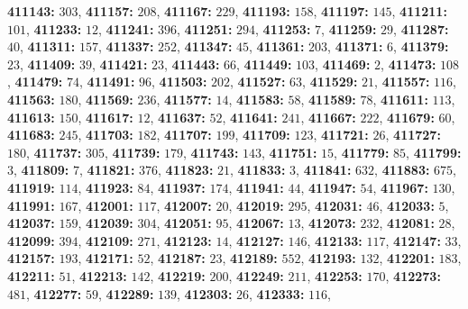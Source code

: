 \textsf{\bfseries 411143:} $303$, \textsf{\bfseries 411157:} $208$, \textsf{\bfseries 411167:} $229$, \textsf{\bfseries 411193:} $158$, \textsf{\bfseries 411197:} $145$, \textsf{\bfseries 411211:} $101$, \textsf{\bfseries 411233:} $12$, \textsf{\bfseries 411241:} $396$, \textsf{\bfseries 411251:} $294$, \textsf{\bfseries 411253:} $7$, \textsf{\bfseries 411259:} $29$, \textsf{\bfseries 411287:} $40$, \textsf{\bfseries 411311:} $157$, \textsf{\bfseries 411337:} $252$, \textsf{\bfseries 411347:} $45$, \textsf{\bfseries 411361:} $203$, \textsf{\bfseries 411371:} $6$, \textsf{\bfseries 411379:} $23$, \textsf{\bfseries 411409:} $39$, \textsf{\bfseries 411421:} $23$, \textsf{\bfseries 411443:} $66$, \textsf{\bfseries 411449:} $103$, \textsf{\bfseries 411469:} $2$, \textsf{\bfseries 411473:} $108$, \textsf{\bfseries 411479:} $74$, \textsf{\bfseries 411491:} $96$, \textsf{\bfseries 411503:} $202$, \textsf{\bfseries 411527:} $63$, \textsf{\bfseries 411529:} $21$, \textsf{\bfseries 411557:} $116$, \textsf{\bfseries 411563:} $180$, \textsf{\bfseries 411569:} $236$, \textsf{\bfseries 411577:} $14$, \textsf{\bfseries 411583:} $58$, \textsf{\bfseries 411589:} $78$, \textsf{\bfseries 411611:} $113$, \textsf{\bfseries 411613:} $150$, \textsf{\bfseries 411617:} $12$, \textsf{\bfseries 411637:} $52$, \textsf{\bfseries 411641:} $241$, \textsf{\bfseries 411667:} $222$, \textsf{\bfseries 411679:} $60$, \textsf{\bfseries 411683:} $245$, \textsf{\bfseries 411703:} $182$, \textsf{\bfseries 411707:} $199$, \textsf{\bfseries 411709:} $123$, \textsf{\bfseries 411721:} $26$, \textsf{\bfseries 411727:} $180$, \textsf{\bfseries 411737:} $305$, \textsf{\bfseries 411739:} $179$, \textsf{\bfseries 411743:} $143$, \textsf{\bfseries 411751:} $15$, \textsf{\bfseries 411779:} $85$, \textsf{\bfseries 411799:} $3$, \textsf{\bfseries 411809:} $7$, \textsf{\bfseries 411821:} $376$, \textsf{\bfseries 411823:} $21$, \textsf{\bfseries 411833:} $3$, \textsf{\bfseries 411841:} $632$, \textsf{\bfseries 411883:} $675$, \textsf{\bfseries 411919:} $114$, \textsf{\bfseries 411923:} $84$, \textsf{\bfseries 411937:} $174$, \textsf{\bfseries 411941:} $44$, \textsf{\bfseries 411947:} $54$, \textsf{\bfseries 411967:} $130$, \textsf{\bfseries 411991:} $167$, \textsf{\bfseries 412001:} $117$, \textsf{\bfseries 412007:} $20$, \textsf{\bfseries 412019:} $295$, \textsf{\bfseries 412031:} $46$, \textsf{\bfseries 412033:} $5$, \textsf{\bfseries 412037:} $159$, \textsf{\bfseries 412039:} $304$, \textsf{\bfseries 412051:} $95$, \textsf{\bfseries 412067:} $13$, \textsf{\bfseries 412073:} $232$, \textsf{\bfseries 412081:} $28$, \textsf{\bfseries 412099:} $394$, \textsf{\bfseries 412109:} $271$, \textsf{\bfseries 412123:} $14$, \textsf{\bfseries 412127:} $146$, \textsf{\bfseries 412133:} $117$, \textsf{\bfseries 412147:} $33$, \textsf{\bfseries 412157:} $193$, \textsf{\bfseries 412171:} $52$, \textsf{\bfseries 412187:} $23$, \textsf{\bfseries 412189:} $552$, \textsf{\bfseries 412193:} $132$, \textsf{\bfseries 412201:} $183$, \textsf{\bfseries 412211:} $51$, \textsf{\bfseries 412213:} $142$, \textsf{\bfseries 412219:} $200$, \textsf{\bfseries 412249:} $211$, \textsf{\bfseries 412253:} $170$, \textsf{\bfseries 412273:} $481$, \textsf{\bfseries 412277:} $59$, \textsf{\bfseries 412289:} $139$, \textsf{\bfseries 412303:} $26$, \textsf{\bfseries 412333:} $116$, 
